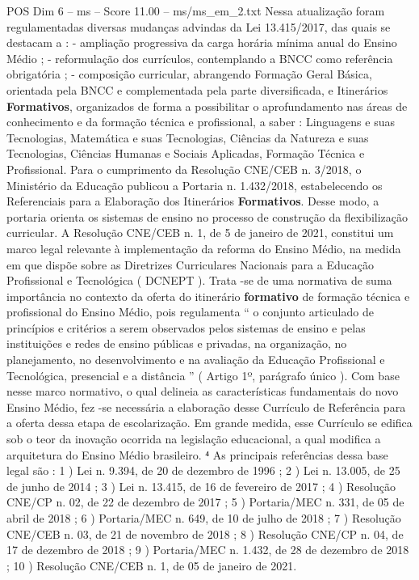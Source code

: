 \begin{textsample}{POS Dim 6 – ms – Score 11.00 – ms/ms\_em\_2.txt}
Nessa atualização foram regulamentadas diversas mudanças advindas da Lei 13.415/2017, das quais se destacam a : - ampliação progressiva da carga horária mínima anual do Ensino Médio ; - reformulação dos currículos, contemplando a BNCC como referência obrigatória ; - composição curricular, abrangendo Formação Geral Básica, orientada pela BNCC e complementada pela parte diversificada, e Itinerários \textbf{Formativos}, organizados de forma a possibilitar o aprofundamento nas áreas de conhecimento e da formação técnica e profissional, a saber : Linguagens e suas Tecnologias, Matemática e suas Tecnologias, Ciências da Natureza e suas Tecnologias, Ciências Humanas e Sociais Aplicadas, Formação Técnica e Profissional.
Para o cumprimento da Resolução CNE/CEB n. 3/2018, o Ministério da Educação publicou a Portaria n. 1.432/2018, estabelecendo os Referenciais para a Elaboração dos Itinerários \textbf{Formativos}.
Desse modo, a portaria orienta os sistemas de ensino no processo de construção da flexibilização curricular.
A Resolução CNE/CEB n. 1, de 5 de janeiro de 2021, constitui um marco legal relevante à implementação da reforma do Ensino Médio, na medida em que dispõe sobre as Diretrizes Curriculares Nacionais para a Educação Profissional e Tecnológica ( DCNEPT ).
Trata -se de uma normativa de suma importância no contexto da oferta do itinerário \textbf{formativo} de formação técnica e profissional do Ensino Médio, pois regulamenta “ o conjunto articulado de princípios e critérios a serem observados pelos sistemas de ensino e pelas instituições e redes de ensino públicas e privadas, na organização, no planejamento, no desenvolvimento e na avaliação da Educação Profissional e Tecnológica, presencial e a distância ” ( Artigo 1º, parágrafo único ).
Com base nesse marco normativo, o qual delineia as características fundamentais do novo Ensino Médio, fez -se necessária a elaboração desse Currículo de Referência para a oferta dessa etapa de escolarização.
Em grande medida, esse Currículo se edifica sob o teor da inovação ocorrida na legislação educacional, a qual modifica a arquitetura do Ensino Médio brasileiro. ⁴ As principais referências dessa base legal são : 1 ) Lei n. 9.394, de 20 de dezembro de 1996 ; 2 ) Lei n. 13.005, de 25 de junho de 2014 ; 3 ) Lei n. 13.415, de 16 de fevereiro de 2017 ; 4 ) Resolução CNE/CP n. 02, de 22 de dezembro de 2017 ; 5 ) Portaria/MEC n. 331, de 05 de abril de 2018 ; 6 ) Portaria/MEC n. 649, de 10 de julho de 2018 ; 7 ) Resolução CNE/CEB n. 03, de 21 de novembro de 2018 ; 8 ) Resolução CNE/CP n. 04, de 17 de dezembro de 2018 ; 9 ) Portaria/MEC n. 1.432, de 28 de dezembro de 2018 ; 10 ) Resolução CNE/CEB n. 1, de 05 de janeiro de 2021.

\end{textsample}
